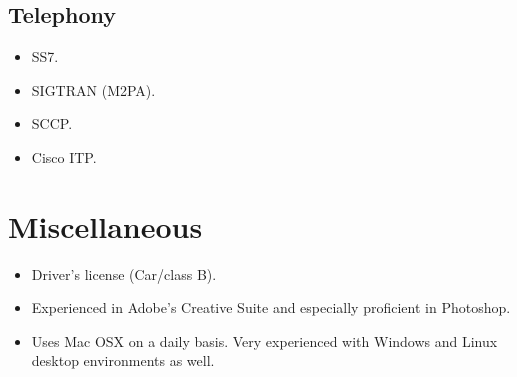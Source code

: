 \documentclass[a4paper, 11pt]{article}
\begin{document}
        \subsection*{Telephony}
            \begin{itemize}
                \item SS7.
                \item SIGTRAN (M2PA).
                \item SCCP.
                \item Cisco ITP.
            \end{itemize}

    \section*{Miscellaneous}
        \begin{itemize}
            \item Driver's license (Car/class B).
            \item Experienced in Adobe's Creative Suite and especially proficient in Photoshop.
            \item Uses Mac OSX on a daily basis. Very experienced with Windows and Linux desktop environments as well.
        \end{itemize}

\end{document}
